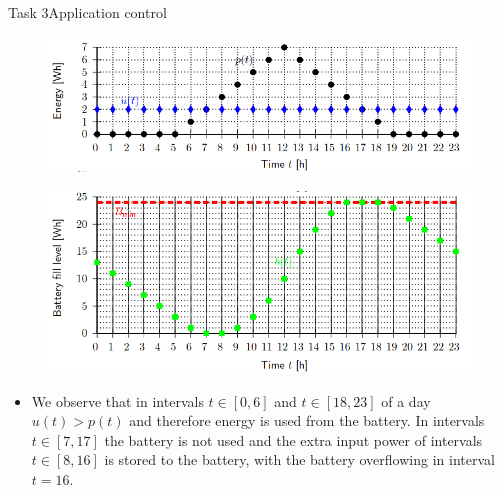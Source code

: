 \begin{frame}[allowframebreaks]{Task 3}{Application control}
  \begin{solutionnoinc}
    \begin{figure}
        \centering
        \includegraphics[scale=0.4]{figures/energyUsage_1.PNG}
    \end{figure}
  \end{solutionnoinc}
  \framebreak
  \begin{solution}
    \begin{figure}
        \centering
        \includegraphics[scale=0.4]{figures/energyUsage_2.PNG}
    \end{figure}
  \end{solution}
  \begin{Sidenote}
    \begin{itemize}
      \item We observe that in intervals $t \in[0,6]$ and $t \in[18,23]$ of a day $u(t)>p(t)$ and therefore energy is used from the battery. In intervals $t \in[7,17]$ the battery is not used and the extra input power of intervals $t \in[8,16]$ is stored to the battery, with the battery overflowing in interval $t=16$.
    \end{itemize}
  \end{Sidenote}
\end{frame}

